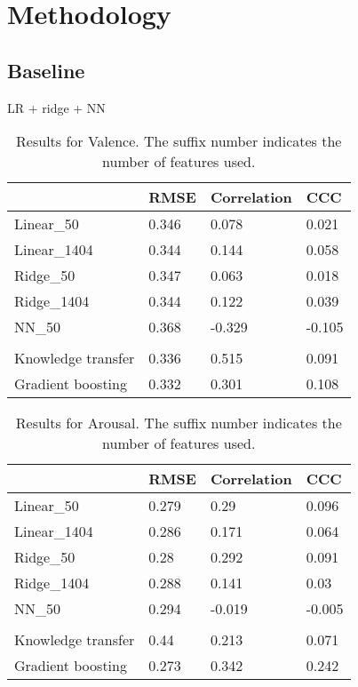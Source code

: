 \documentclass{article}
\begin{document}
\section{Methodology}


\subsection{Baseline}
LR + ridge + NN

\begin{table}[]
\centering
\begin{tabular}{|l|l|l|l|}
\hline
					& RMSE		& Correlation 	& CCC 	 \\ \hline
Linear\_50			& 0.346		& 0.078			& 0.021  \\ \hline	
Linear\_1404		& 0.344		& 0.144 		& 0.058	 \\ \hline
Ridge\_50			& 0.347 	& 0.063			& 0.018	 \\ \hline
Ridge\_1404			& 0.344		& 0.122			& 0.039	 \\ \hline
NN\_50				& 0.368		& -0.329		& -0.105 \\ \hline
& & & \\ \hline
Knowledge transfer 	& 0.336		& 0.515			& 0.091	 \\ \hline
Gradient boosting 	& 0.332 	& 0.301 		& 0.108  \\ \hline
\end{tabular}
\caption{Results for Valence. The suffix number indicates the number of features used.}
\label{Valence_table}
\end{table}

\begin{table}[]
\centering
\begin{tabular}{|l|l|l|l|}
\hline
					& RMSE		& Correlation 	& CCC 	 \\ \hline
Linear\_50			& 0.279		& 0.29			& 0.096  \\ \hline	
Linear\_1404		& 0.286		& 0.171 		& 0.064	 \\ \hline
Ridge\_50			& 0.28  	& 0.292			& 0.091	 \\ \hline
Ridge\_1404			& 0.288		& 0.141			& 0.03	 \\ \hline
NN\_50				& 0.294		& -0.019		& -0.005 \\ \hline
& & & \\ \hline
Knowledge transfer 	& 0.44		& 0.213 		& 0.071	 \\ \hline
Gradient boosting 	& 0.273 	& 0.342 		& 0.242  \\ \hline
\end{tabular}
\caption{Results for Arousal. The suffix number indicates the number of features used.}
\label{Valence_table}
\end{table}
\end{document}
